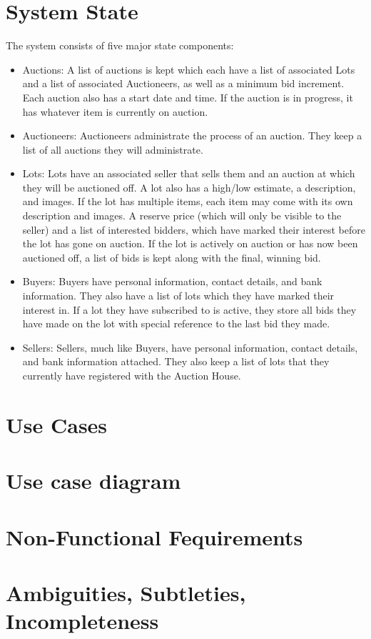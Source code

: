 \documentclass{article}
\begin{document}
\section{System State}
The system consists of five major state components:
\begin{itemize}
\item Auctions: A list of auctions is kept which each have a list of associated Lots and a list of associated Auctioneers, as well as a minimum bid increment. Each auction also has a start date and time. If the auction is in progress, it has whatever item is currently on auction.
\item Auctioneers: Auctioneers administrate the process of an auction. They keep a list of all auctions they will administrate.
\item Lots: Lots have an associated seller that sells them and an auction at which they will be auctioned off. A lot also has a high/low estimate, a description, and images. If the lot has multiple items, each item may come with its own description and images. A reserve price (which will only be visible to the seller) and a list of interested bidders, which have marked their interest before the lot has gone on auction. If the lot is actively on auction or has now been auctioned off, a list of bids is kept along with the final, winning bid.
\item Buyers: Buyers have personal information, contact details, and bank information. They also have a list of lots which they have marked their interest in. If a lot they have subscribed to is active, they store all bids they have made on the lot with special reference to the last bid they made.
\item Sellers: Sellers, much like Buyers, have personal information, contact details, and bank information attached. They also keep a list of lots that they currently have registered with the Auction House.
\end{itemize}
\section{Use Cases}

\section{Use case diagram}

\section{Non-Functional Fequirements}

\section{Ambiguities, Subtleties, Incompleteness}
\end{document}

